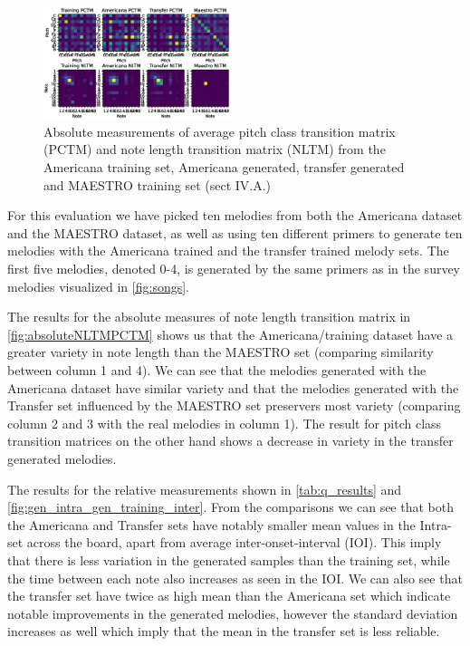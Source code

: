 \documentclass{IEEEtran}
\begin{document}
\begin{figure}
    \centering
    \includegraphics[width=0.485\textwidth]{PCTMNLTM.eps}
    \caption{
        Absolute measurements of average pitch class transition matrix
        (PCTM) and note length transition matrix (NLTM) from the Americana
        training set, Americana generated, transfer generated and MAESTRO
        training set (sect IV.A.)
        \label{fig:absoluteNLTMPCTM}
    }
\end{figure}

For this evaluation we have picked ten melodies from both the Americana
dataset and the MAESTRO dataset, as well as using ten different primers to
generate ten melodies with the Americana trained and the transfer trained
melody sets. The first  five melodies, denoted 0-4, is generated by the
same primers as in the survey melodies visualized in \autoref{fig:songs}.

The results for the absolute measures of note length transition matrix
in \autoref{fig:absoluteNLTMPCTM} shows us that the Americana/training dataset have
a greater variety in note length than the MAESTRO set (comparing similarity 
between column 1 and 4). We can see that the
melodies generated with the Americana dataset have similar variety and that
the melodies generated with the Transfer set influenced by the MAESTRO set preservers
most variety (comparing column 2 and 3 with the real melodies in column 1). 
The result for pitch class transition matrices on the other
hand shows a decrease in variety in the transfer generated melodies.

The results for the relative measurements shown in \autoref{tab:q_results}
and \autoref{fig:gen_intra_gen_training_inter}. From the comparisons we
can see that both the Americana and Transfer sets have notably smaller mean
values in the Intra-set across the board, apart from average
inter-onset-interval (IOI). This imply that there is less variation in
the generated samples than the training set, while the time between each note
also increases as seen in the IOI. We can also see that the transfer set
have twice as high mean than the Americana set which indicate notable
improvements in the generated melodies, however the standard deviation
increases as well which imply that the mean in the transfer set is less
reliable.
\end{document}
